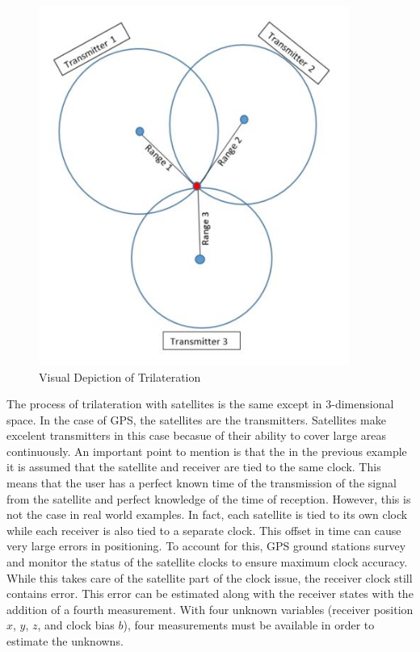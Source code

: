 \documentclass[12pt]{report}
\begin{document}
\begin{figure}[h]
    \centering
    \includegraphics[width=4.0in]{Trilateration.JPG}
    \caption{Visual Depiction of Trilateration}
    \label{fig:Trilateration}
\end{figure}

The process of trilateration with satellites is the same except in 3-dimensional space. In the case of GPS, the satellites are the transmitters. Satellites make excelent transmitters in this case becasue of their ability to cover large areas continuously. An important point to mention is that the in the previous example it is assumed that the satellite and receiver are tied to the same clock. This means that the user has a perfect known time of the transmission of the signal from the satellite and perfect knowledge of the time of reception. However, this is not the case in real world examples. In fact, each satellite is tied to its own clock while each receiver is also tied to a separate clock. This offset in time can cause very large errors in positioning. To account for this, GPS ground stations survey and monitor the status of the satellite clocks to ensure maximum clock accuracy. While this takes care of the satellite part of the clock issue, the receiver clock still contains error. This error can be estimated along with the receiver states with the addition of a fourth measurement. With four unknown variables (receiver position $x$, $y$, $z$, and clock bias $b$), four measurements must be available in order to estimate the unknowns. 
\end{document}
